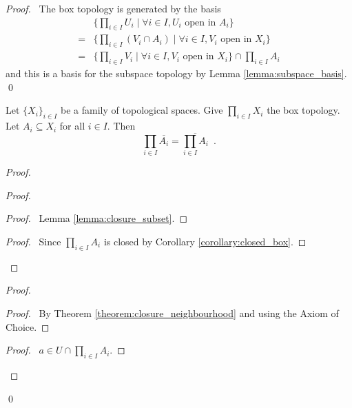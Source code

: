\begin{proof}
    \pf\ The box topology is generated by the basis
    \begin{align*}
        & \{ \prod_{i \in I} U_i \mid \forall i \in I, U_i \text{ open in } A_i \} \\
        = & \{ \prod_{i \in I} (V_i \cap A_i) \mid \forall i \in I, V_i \text{ open in } X_i \} \\
        = & \{ \prod_{i \in I} V_i \mid \forall i \in I, V_i \text{ open in } X_i \} \cap \prod_{i \in I} A_i
    \end{align*}
    and this is a basis for the subspace topology by Lemma \ref{lemma:subspace_basis}. \qed
\end{proof}

\begin{proposition}[AC]
    Let $\{ X_i \}_{i \in I}$ be a family of topological spaces. Give $\prod_{i \in I} X_i$ the box topology.
    Let $A_i \subseteq X_i$ for all $i \in I$.
    Then
    \[ \prod_{i \in I} \overline{A_i} = \overline{\prod_{i \in I} A_i} \enspace . \]
\end{proposition}

\begin{proof}
    \pf
    \begin{proof}
        \begin{proof}
            \pf\ Lemma \ref{lemma:closure_subset}.
        \end{proof}
        \qedstep
        \begin{proof}
            \pf\ Since $\prod_{i \in I} A_i$ is closed by Corollary \ref{corollary:closed_box}.
        \end{proof}
    \end{proof}
    \begin{proof}
        \begin{proof}
            \pf\ By Theorem \ref{theorem:closure_neighbourhood} and  using the Axiom of Choice.
        \end{proof}
        \qedstep
        \begin{proof}
            \pf\ $a \in U \cap \prod_{i \in I} A_i$.
        \end{proof}
    \end{proof}
    \qed
\end{proof}

